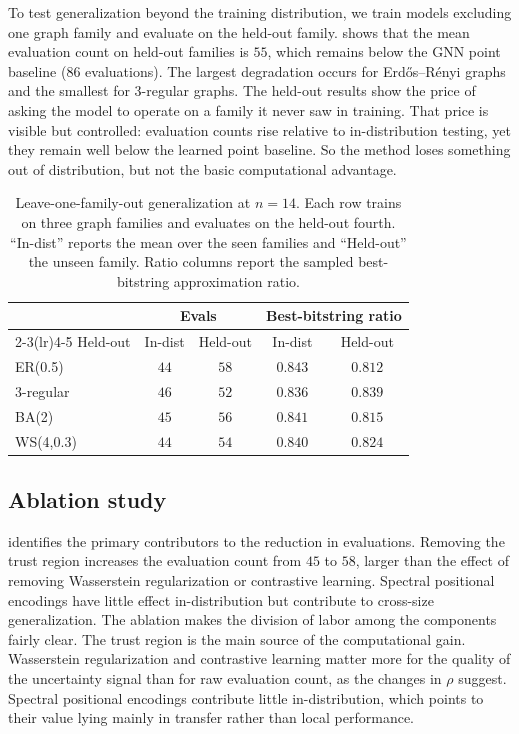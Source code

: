 \documentclass[aps,prx,reprint,superscriptaddress,longbibliography]{revtex4-2}
\newcommand{\GNN}{\textnormal{\textsc{GNN}}}
\begin{document}
To test generalization beyond the training distribution, we train
models excluding one graph family and evaluate on the held-out
family.  shows that the mean evaluation count on
held-out families is $55$, which remains below the \GNN{} point
baseline ($86$ evaluations). The largest degradation occurs for
Erd\H{o}s--R\'enyi graphs and the smallest for 3-regular graphs.
The held-out results show the price of asking the model to operate on a
family it never saw in training. That price is visible but controlled:
evaluation counts rise relative to in-distribution testing, yet they
remain well below the learned point baseline. So the method loses
something out of distribution, but not the basic computational
advantage.

\begin{table}[t]
\caption{Leave-one-family-out generalization at $n{=}14$. Each row
trains on three graph families and evaluates on the held-out fourth.
``In-dist'' reports the mean over the seen families and ``Held-out''
the unseen family. Ratio columns report the sampled best-bitstring
approximation ratio.
\label{tab:lofo}}
\begin{ruledtabular}
\begin{tabular}{lcccc}
    & \multicolumn{2}{c}{Evals}
    & \multicolumn{2}{c}{Best-bitstring ratio} \\
    \cmidrule(lr){2-3}\cmidrule(lr){4-5}
    Held-out & In-dist & Held-out & In-dist & Held-out \\
    \hline
    ER(0.5)     & $44$ & $58$ & $0.843$ & $0.812$ \\
    3-regular   & $46$ & $52$ & $0.836$ & $0.839$ \\
    BA(2)       & $45$ & $56$ & $0.841$ & $0.815$ \\
    WS(4,0.3)   & $44$ & $54$ & $0.840$ & $0.824$ \\
\end{tabular}
\end{ruledtabular}
\end{table}



\subsection{Ablation study}
\label{sec:ablation}

 identifies the primary contributors to the
reduction in evaluations. Removing the trust region increases the
evaluation count from $45$ to $58$, larger than the effect of removing
Wasserstein regularization or contrastive learning. Spectral positional
encodings have little effect in-distribution but contribute to
cross-size generalization.
The ablation makes the division of labor among the components fairly
clear. The trust region is the main source of the computational gain.
Wasserstein regularization and contrastive learning matter more for the
quality of the uncertainty signal than for raw evaluation count, as the
changes in $\rho$ suggest. Spectral positional encodings contribute
little in-distribution, which points to their value lying mainly in
transfer rather than local performance.
\end{document}
